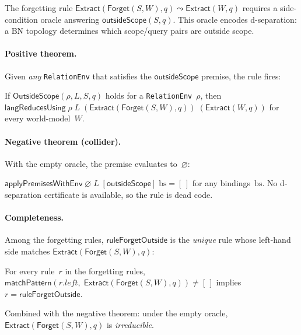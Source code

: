 \documentclass[11pt,openany]{report}
\begin{document}
The forgetting rule
$\mathsf{Extract}(\mathsf{Forget}(S,W), q) \leadsto \mathsf{Extract}(W, q)$
requires a side-condition oracle answering $\mathsf{outsideScope}(S, q)$.
This oracle encodes d-separation: a BN topology determines which
scope/query pairs are outside scope.

\paragraph{Positive theorem.}
Given \emph{any} \texttt{RelationEnv} that satisfies the
$\mathsf{outsideScope}$ premise, the rule fires:

\begin{theorem}
If $\mathsf{OutsideScope}(\rho, L, S, q)$ holds for a
\texttt{RelationEnv}~$\rho$, then
$\mathsf{langReducesUsing}\;\rho\;L\;
(\mathsf{Extract}(\mathsf{Forget}(S,W), q))\;
(\mathsf{Extract}(W, q))$
for every world-model~$W$.
\end{theorem}

\paragraph{Negative theorem (collider).}
With the empty oracle, the premise evaluates to~$\varnothing$:

\begin{theorem}
$\mathsf{applyPremisesWithEnv}\;\varnothing\;L\;
[\mathsf{outsideScope}]\;\mathrm{bs} = [\,]$
for any bindings~$\mathrm{bs}$.
No d-separation certificate is available, so the rule is dead code.
\end{theorem}

\paragraph{Completeness.}
Among the forgetting rules, $\mathsf{ruleForgetOutside}$ is the
\emph{unique} rule whose left-hand side matches
$\mathsf{Extract}(\mathsf{Forget}(S,W), q)$:

\begin{theorem}
For every rule~$r$ in the forgetting rules,
$\mathsf{matchPattern}(r.\mathit{left},\;
\mathsf{Extract}(\mathsf{Forget}(S,W), q)) \ne [\,]$
implies $r = \mathsf{ruleForgetOutside}$.
\end{theorem}

\noindent
Combined with the negative theorem: under the empty oracle,
$\mathsf{Extract}(\mathsf{Forget}(S,W), q)$ is \emph{irreducible}.
\end{document}
